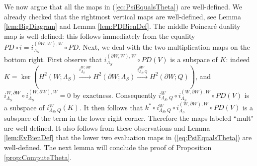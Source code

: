 \documentclass[11pt,a4paper]{amsart}
\theoremstyle{definition}
\begin{document}
We now argue that all the maps in (\ref{eq:PsiEqualsTheta}) are well-defined. 
We already checked that the rightmost vertical maps are well-defined, see Lemma \ref{lem:BigDiagram} and Lemma \ref{lem:PDBienDef}.
The middle Poincar\'e duality map is well-defined: this follows immediately from the equality $PD \circ i =i_{\Lambda_S}^{(\partial W, W),W} \circ PD.$ 
Next, we deal with the two multiplication maps on the bottom right. 
First observe that $i_{\Lambda_S}^{(\partial W, W),W} \circ PD(V)$ is a subspace of $K$: indeed $K=\ker (H^2(W;\Lambda_S) \stackrel{i^{W,\partial W}_{\Lambda_S}}{\longrightarrow} H^2(\partial W;\Lambda_S) \stackrel{i^{\partial W}_{\Lambda_S,Q}}{\longrightarrow} H^2(\partial W;Q))$, and $i^{W,\partial W}_{\Lambda_S} \circ i_{\Lambda_S}^{(W,\partial W),W}=0$ by exactness. 
Consequently $i^W_{\Lambda_S,Q} \circ  i_{\Lambda_S}^{(W,\partial W),W} \circ PD(V)$ is a subspace of $i^W_{\Lambda_S,Q}(K)$. It then follows that $k^* \circ i^W_{\Lambda_S,Q} \circ i_{\Lambda_S}^{(W,\partial W),W} \circ PD(V)$ is a subspace of the term in the lower right corner. 
Therefore the maps labeled ``mult" are well defined.
It also follows from these observations and Lemma \ref{lem:EvBienDef} that the lower two evaluation maps in (\ref{eq:PsiEqualsTheta}) are well-defined. 
The next lemma will conclude the proof of Proposition \ref{prop:ComputeTheta}.
\end{document}
